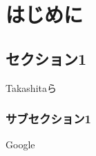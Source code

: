 
\chapter{はじめに}
\section{セクション1}
Takashitaら\cite{takashita}
\subsection{サブセクション1}
Google\cite{google}











